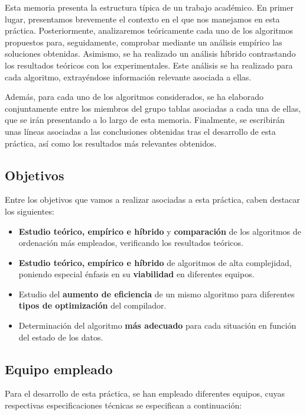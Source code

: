 \documentclass{homework}
\begin{document}
	Esta memoria presenta la estructura típica de un trabajo académico. En primer lugar, presentamos
    brevemente el contexto en el que nos manejamos en esta práctica. Posteriormente, analizaremos teóricamente
    cada uno de los algoritmos propuestos para, seguidamente, comprobar mediante un 
    análisis empírico las soluciones obtenidas. Asimismo, se ha realizado un análisis híbrido contrastando
    los resultados teóricos con los experimentales. Este análisis se ha realizado para cada algoritmo, 
    extrayéndose información relevante asociada a ellas. 
    
    Además, para cada uno de los algoritmos considerados, se ha
    elaborado conjuntamente entre los miembros del grupo tablas asociadas a cada una de ellas, que se
    irán presentando a lo largo de esta memoria. Finalmente, se escribirán unas
    líneas asociadas a las conclusiones obtenidas tras el desarrollo de esta práctica, así como los resultados
    más relevantes obtenidos. 

    \subsection{Objetivos} 

    Entre los objetivos que vamos a realizar asociadas a esta práctica, caben destacar los siguientes: 

    \begin{itemize}
        \item \textbf{Estudio teórico, empírico e híbrido} y \textbf{comparación} de los algoritmos de ordenación más empleados, verificando los resultados teóricos.
        \item \textbf{Estudio teórico, empírico e híbrido} de algoritmos de alta complejidad, poniendo especial énfasis en su \textbf{viabilidad} en diferentes equipos. 
        \item Estudio del \textbf{aumento de eficiencia} de un mismo algoritmo para diferentes \textbf{tipos de optimización} del compilador. 
        \item Determinación del algoritmo \textbf{más adecuado} para cada situación en función del estado de los datos.
    \end{itemize}

    \subsection{Equipo empleado}

    Para el desarrollo de esta práctica, se han empleado diferentes equipos, cuyas respectivas especificaciones técnicas se 
    especifican a continuación:
    
\end{document}
